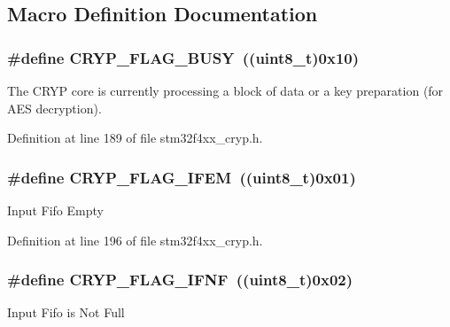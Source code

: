 \subsection{Macro Definition Documentation}
\hypertarget{group___c_r_y_p__flags__definition_ga701f57afbf29f56f57eadc76835008ce}{
\subsubsection[{C\-R\-Y\-P\-\_\-\-F\-L\-A\-G\-\_\-\-B\-U\-S\-Y}]{\setlength{\rightskip}{0pt plus 5cm}\#define C\-R\-Y\-P\-\_\-\-F\-L\-A\-G\-\_\-\-B\-U\-S\-Y~((uint8\-\_\-t)0x10)}}\label{group___c_r_y_p__flags__definition_ga701f57afbf29f56f57eadc76835008ce}
The C\-R\-Y\-P core is currently processing a block of data or a key preparation (for A\-E\-S decryption). 

Definition at line 189 of file stm32f4xx\-\_\-cryp.\-h.

\hypertarget{group___c_r_y_p__flags__definition_gac595f461b1eae355a5f22c6ddbb6b795}{
\subsubsection[{C\-R\-Y\-P\-\_\-\-F\-L\-A\-G\-\_\-\-I\-F\-E\-M}]{\setlength{\rightskip}{0pt plus 5cm}\#define C\-R\-Y\-P\-\_\-\-F\-L\-A\-G\-\_\-\-I\-F\-E\-M~((uint8\-\_\-t)0x01)}}\label{group___c_r_y_p__flags__definition_gac595f461b1eae355a5f22c6ddbb6b795}
Input Fifo Empty 

Definition at line 196 of file stm32f4xx\-\_\-cryp.\-h.

\hypertarget{group___c_r_y_p__flags__definition_ga0c5c1eb9236f373c522cbc407b18b7dd}{
\subsubsection[{C\-R\-Y\-P\-\_\-\-F\-L\-A\-G\-\_\-\-I\-F\-N\-F}]{\setlength{\rightskip}{0pt plus 5cm}\#define C\-R\-Y\-P\-\_\-\-F\-L\-A\-G\-\_\-\-I\-F\-N\-F~((uint8\-\_\-t)0x02)}}\label{group___c_r_y_p__flags__definition_ga0c5c1eb9236f373c522cbc407b18b7dd}
Input Fifo is Not Full 

